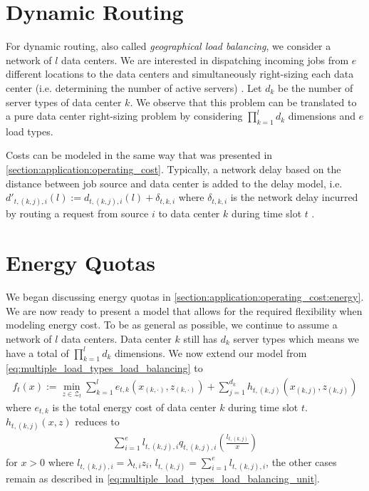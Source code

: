 \section{Dynamic Routing}\label{section:application:dynamic_routing}

For dynamic routing, also called \textit{geographical load balancing}, we consider a network of $l$ data centers. We are interested in dispatching incoming jobs from $e$ different locations to the data centers and simultaneously right-sizing each data center (i.e. determining the number of active servers) \cite{Lin2012}. Let $d_k$ be the number of server types of data center $k$. We observe that this problem can be translated to a pure data center right-sizing problem by considering $\prod_{k=1}^l d_k$ dimensions and $e$ load types.

Costs can be modeled in the same way that was presented in \autoref{section:application:operating_cost}. Typically, a network delay based on the distance between job source and data center is added to the delay model, i.e. $d'_{t,(k,j),i}(l) := d_{t,(k,j),i}(l) + \delta_{t,k,i}$ where $\delta_{t,k,i}$ is the network delay incurred by routing a request from source $i$ to data center $k$ during time slot $t$ \cite{Lin2012}.

\section{Energy Quotas}\label{section:application:energy_quotas}

We began discussing energy quotas in \autoref{section:application:operating_cost:energy}. We are now ready to present a model that allows for the required flexibility when modeling energy cost. To be as general as possible, we continue to assume a network of $l$ data centers. Data center $k$ still has $d_k$ server types which means we have a total of $\prod_{k=1}^l d_k$ dimensions. We now extend our model from \autoref{eq:multiple_load_types_load_balancing} to \begin{align*}
    f_t(x) := \min_{z \in \mathcal{Z}_t} \sum_{k=1}^l e_{t,k}(x_{(k,\cdot)},z_{(k,\cdot)}) + \sum_{j=1}^{d_k} h_{t,(k,j)}(x_{(k,j)},z_{(k,j)})
\end{align*} where $e_{t,k}$ is the total energy cost of data center $k$ during time slot $t$. $h_{t,(k,j)}(x,z)$ reduces to \begin{align*}
    \sum_{i=1}^e l_{t,(k,j),i} q_{t,(k,j),i}\left(\frac{l_{t,(k,j)}}{x}\right)
\end{align*} for $x > 0$ where $l_{t,(k,j),i} = \lambda_{t,i} z_i$, $l_{t,(k,j)} = \sum_{i=1}^e l_{t,(k,j),i}$, the other cases remain as described in \autoref{eq:multiple_load_types_load_balancing_unit}.

